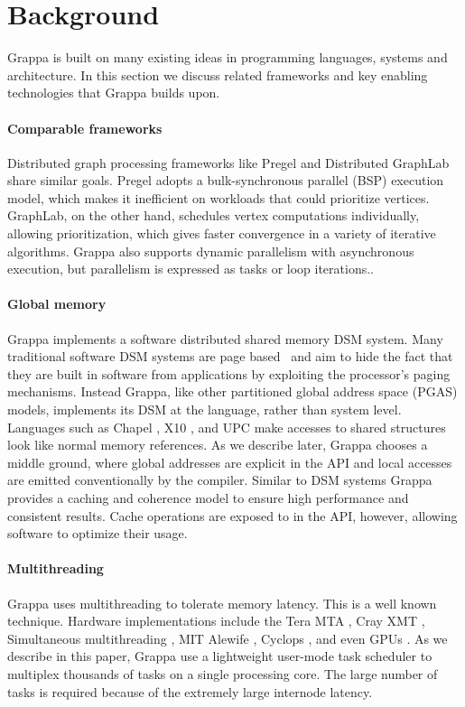 \section{Background}

Grappa is built on many existing ideas in programming languages, systems and
architecture. In this section we discuss related frameworks and key enabling
technologies that Grappa builds upon.

\paragraph{Comparable frameworks}
Distributed graph processing frameworks like Pregel \cite{pregel:2010} and
Distributed GraphLab \cite{distgraphlab:vldb12} share similar goals. Pregel
adopts a bulk-synchronous parallel (BSP) execution model, which makes it
inefficient on workloads that could prioritize vertices. GraphLab, on the
other hand, schedules vertex computations individually, allowing
prioritization, which gives faster convergence in a variety of iterative
algorithms. Grappa also supports dynamic parallelism
with asynchronous execution, but parallelism is expressed as tasks or loop
iterations..

\paragraph{Global memory}
Grappa implements a software distributed shared memory DSM system. Many
traditional software DSM systems are page based~\cite{Treadmarks,munin} and
aim to hide the fact that they are built in software from applications by
exploiting the processor's paging mechanisms. Instead Grappa, like other
partitioned global address space (PGAS) models, implements its DSM at the
language, rather than system level. Languages such as Chapel \cite{Chapel},
X10 \cite{X10}, and UPC \cite{UPC} make accesses to shared structures look
like normal memory references. As we describe later, Grappa chooses a middle
ground, where global addresses are explicit in the API and local accesses are
emitted conventionally by the compiler. Similar to DSM systems Grappa provides
a caching and coherence model to ensure high performance and consistent
results. Cache operations are exposed to in the API, however, allowing
software to optimize their usage.

\paragraph{Multithreading}
Grappa uses multithreading to tolerate memory latency. This is a well known
technique. Hardware implementations include the Tera MTA \cite{Tera}, Cray XMT
\cite{XMT}, Simultaneous multithreading \cite{SMT}, MIT Alewife
\cite{Alewife}, Cyclops \cite{Cyclops}, and even GPUs \cite{fatahalian}. As we
describe in this paper, Grappa use a lightweight user-mode task scheduler to
multiplex thousands of tasks on a single processing core. The large number of
tasks is required because of the extremely large internode latency.
